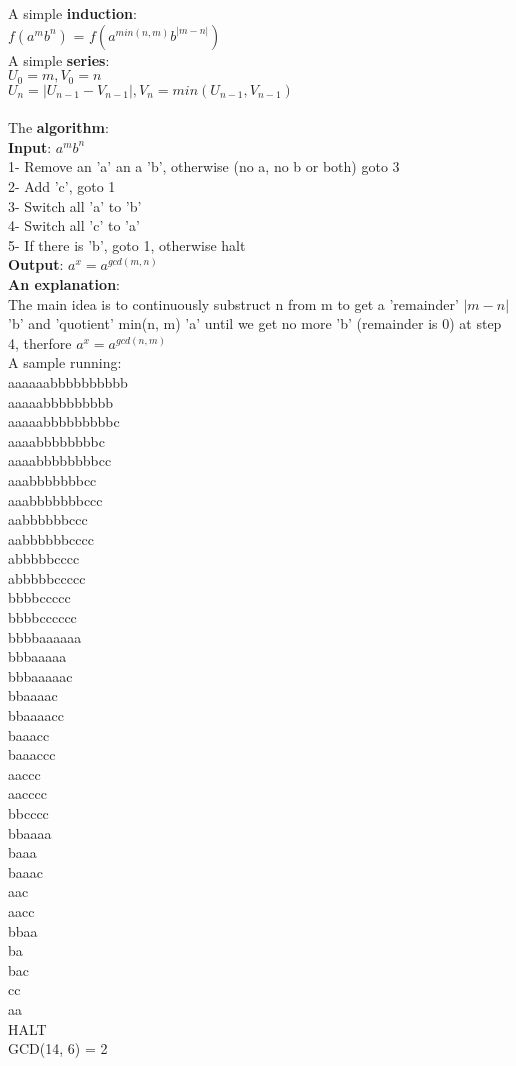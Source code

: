 \documentclass{article}
\begin{document}
\noindent A simple \textbf{induction}:\\
$f(a^mb^n)$ = $f(a^{min(n, m)}b^{|m - n|})$\\
A simple \textbf{series}:\\
$U_0  = m, V_0 = n$\\
$U_n = |U_{n-1} - V_{n-1}|, V_n = min(U_{n-1}, V_{n-1})$\\\\
The \textbf{algorithm}:\\
\textbf{Input}: $a^mb^n$\\
1- Remove an 'a' an a 'b', otherwise (no a, no b or both) goto 3\\
2- Add 'c', goto 1\\
3- Switch all 'a' to 'b'\\
4- Switch all 'c' to 'a'\\
5- If there is 'b', goto 1, otherwise halt\\
\textbf{Output}: $a^x = a^{gcd(m, n)}$\\

\textbf{An explanation}:\\
The main idea is to continuously substruct n from m to get
a 'remainder' $|m - n|$ 'b' and  'quotient'  min(n, m)  'a'
until we get no more 'b' (remainder is 0) at step 4, therfore
$a^x = a^{gcd(n, m)}$\\


 \noindent A sample running:\\
aaaaaabbbbbbbbbb\\
aaaaabbbbbbbbb\\
aaaaabbbbbbbbbc\\
aaaabbbbbbbbc\\
aaaabbbbbbbbcc\\
aaabbbbbbbcc\\
aaabbbbbbbccc\\
aabbbbbbccc\\
aabbbbbbcccc\\
abbbbbcccc\\
abbbbbccccc\\
bbbbccccc\\
bbbbcccccc\\
bbbbaaaaaa\\
bbbaaaaa\\
bbbaaaaac\\
bbaaaac\\
bbaaaacc\\
baaacc\\
baaaccc\\
aaccc\\
aacccc\\
bbcccc\\
bbaaaa\\
baaa\\
baaac\\
aac\\
aacc\\
bbaa\\
ba\\
bac\\
cc\\
aa\\
HALT\\
GCD(14, 6) = 2
\end{document}
